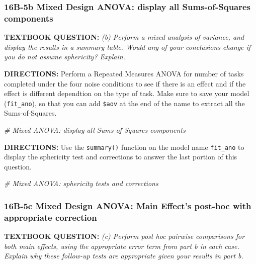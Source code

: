 \documentclass[]{article}
\newenvironment{Shaded}{\begin{snugshade}}{\end{snugshade}}
\newcommand{\CommentTok}[1]{\textcolor[rgb]{0.56,0.35,0.01}{\textit{#1}}}
\begin{document}
\clearpage

\subsubsection{16B-5b Mixed Design ANOVA: display all Sums-of-Squares
components}\label{b-5b-mixed-design-anova-display-all-sums-of-squares-components}

\textbf{TEXTBOOK QUESTION:} \emph{(b) Perform a mixed analysis of
variance, and display the results in a summary table. Would any of your
conclusions change if you do not assume sphericity? Explain.}

\textbf{DIRECTIONS:} Perform a Repeated Measures ANOVA for number of
tasks completed under the four noise conditions to see if there is an
effect and if the effect is different dependtion on the type of task.
Make sure to save your model (\texttt{fit\_ano}), so that you can add
\texttt{\$aov} at the end of the name to extract all the
Sums-of-Squares.

\begin{Shaded}
\begin{Highlighting}[]
\CommentTok{# Mixed ANOVA: display all Sums-of-Squares components}
\end{Highlighting}
\end{Shaded}

\clearpage

\textbf{DIRECTIONS:} Use the \texttt{summary()} function on the model
name \texttt{fit\_ano} to display the sphericity test and corrections to
answer the last portion of this question.

\begin{Shaded}
\begin{Highlighting}[]
\CommentTok{# Mixed ANOVA: sphericity tests and corrections}
\end{Highlighting}
\end{Shaded}

\clearpage

\subsubsection{16B-5c Mixed Design ANOVA: Main Effect's post-hoc with
appropriate
correction}\label{b-5c-mixed-design-anova-main-effects-post-hoc-with-appropriate-correction}

\textbf{TEXTBOOK QUESTION:} \emph{(c) Perform post hoc pairwise
comparisons for both main effects, using the appropriate error term from
part b in each case. Explain why these follow-up tests are appropriate
given your results in part b.}
\end{document}
